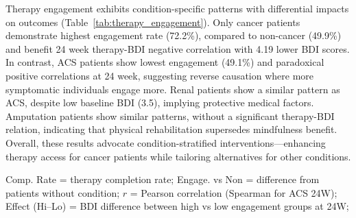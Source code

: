 \documentclass[conference]{IEEEtran}
\begin{document}
Therapy engagement exhibits condition-specific patterns with differential impacts on outcomes (Table~\ref{tab:therapy_engagement}). Only cancer patients demonstrate highest engagement rate (72.2\%), compared to non-cancer (49.9\%) and benefit 24 week therapy-BDI negative correlation with 4.19 lower BDI scores. In contrast, ACS patients show lowest engagement (49.1\%) and paradoxical positive correlations at 24 week, suggesting reverse causation where more symptomatic individuals engage more. Renal patients show a similar pattern as ACS, despite low baseline BDI (3.5), implying protective medical factors. Amputation patients show similar patterns, without a significant therapy-BDI relation, indicating that physical rehabilitation supersedes mindfulness benefit. Overall, these results advocate condition-stratified interventions—enhancing therapy access for cancer patients while tailoring alternatives for other conditions.

\begin{table}[h]
\centering
\caption{Therapy Engagement and Depression Outcomes by Medical Condition}
\parbox[t]{\linewidth}{\vspace{1ex}\footnotesize
Comp. Rate = therapy completion rate; Engage. vs Non = difference from patients without condition; 
$r$ = Pearson correlation (Spearman for ACS 24W); Effect (Hi–Lo) = BDI difference between high vs low engagement groups at 24W; }
\label{tab:therapy_engagement}
\end{table}
\end{document}
